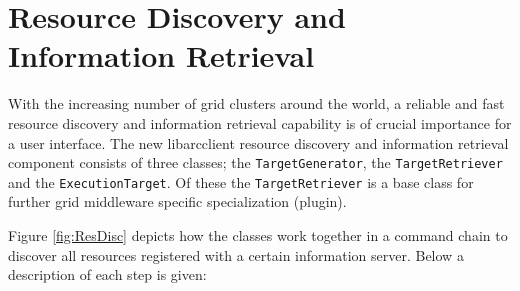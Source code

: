 \documentclass{book}
\newcommand{\libarcclient}{libarcclient}
\newcommand{\ExecutionTarget}{\texttt{ExecutionTarget}}
\newcommand{\TargetGenerator}{\texttt{TargetGenerator}}
\newcommand{\TargetRetriever}{\texttt{TargetRetriever}}
\begin{document}
\section{Resource Discovery and Information Retrieval}
\label{sec:TargetDiscovery}

With the increasing number of grid clusters around the world, a
reliable and fast resource discovery and information retrieval
capability is of crucial importance for a user interface. The new
{\libarcclient} resource discovery and information retrieval component
consists of three classes; the {\TargetGenerator}, the
{\TargetRetriever} and the {\ExecutionTarget}. Of these the
{\TargetRetriever} is a base class for further grid middleware
specific specialization (plugin).

Figure \ref{fig:ResDisc} depicts how the classes work together in a
command chain to discover all resources registered with a certain
information server. Below a description of each step is given:

\begin{figure}[ht]
\end{figure}
\end{document}
